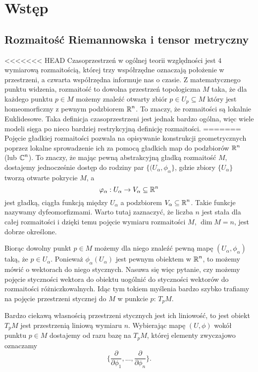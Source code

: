 \section{Wstęp}

\subsection{Rozmaitość Riemannowska i tensor metryczny}

<<<<<<< HEAD
Czasoprzestrzeń w ogólnej teorii względności jest $4$ wymiarową rozmaitością, której trzy współrzędne oznaczają położenie w przestrzeni, a czwarta współrzędna informuje nas o czasie. Z matematycznego punktu widzenia, rozmaitość to dowolna przestrzeń topologiczna $M$ taka, że dla każdego punktu $p\in M$ możemy znaleźć otwarty zbiór $p\in U_p\subseteq M$ który jest homeomorficzny z pewnym podzbiorem $\operatorname{\mathbb{R}}^n$. To znaczy, że rozmaitości są lokalnie Euklidesowe. Taka definicja czasoprzestrzeni jest jednak bardzo ogólna, więc wiele modeli sięga po nieco bardziej restrykcyjną definicję rozmaitości.
=======
Pojęcie gładkiej rozmaitości pozwala na opisywanie konstrukcji geometrycznych poprzez lokalne sprowadzenie ich za pomocą gładkich map do podzbiorów $\operatorname{\mathbb{R}}^n$ (lub $\operatorname{\mathbb{C}}^n$). To znaczy, że mając pewną abstrakcyjną gładką rozmaitość $M$, dostajemy jednocześnie dostęp do rodziny par $\{(U_\alpha,\phi_\alpha\}$, gdzie zbiory $\{U_\alpha\}$ tworzą otwarte pokrycie $M$, a 
$$\varphi_\alpha:U_\alpha\to V_\alpha\subseteq \operatorname{\mathbb{R}}^n$$
jest gładką, ciągła funkcją między $U_\alpha$ a podzbiorem $V_\alpha\subseteq\operatorname{\mathbb{R}}^n$. Takie funkcje nazywamy dyfeomorfizmami. Warto tutaj zaznaczyć, że liczba $n$ jest stała dla całej rozmaitości i dzięki temu pojęcie wymiaru rozmaitości $M$, $\dim M=n$, jest dobrze określone.

Biorąc dowolny punkt $p\in M$ możemy dla niego znaleźć pewną mapę $(U_\alpha,\phi_\alpha)$ taką, że $p\in U_\alpha$. Ponieważ $\phi_\alpha(U_\alpha)$ jest pewnym obiektem w $\operatorname{\mathbb{R}}^n$, to możemy mówić o wektorach do niego stycznych. Nasuwa się więc pytanie, czy możemy pojęcie styczności wektora do obiektu uogólnić do styczności wektorów do rozmaitości różniczkowalnych. Idąc tym tokiem myślenia bardzo szybko trafiamy na pojęcie przestrzeni stycznej do $M$ w punkcie $p$: $T_pM$. 

Bardzo ciekawą własnością przestrzeni stycznych jest ich liniowość, to jest obiekt $T_pM$ jest przestrzenią liniową wymiaru $n$. Wybierając mapę $(U, \phi)$ wokół punktu $p\in M$ dostajemy od razu bazę na $T_pM$, której elementy zwyczajowo oznaczamy
$$\{ \frac{\partial}{\partial\phi_1} , ... , \frac{\partial}{\partial\phi_n} \}.$$








